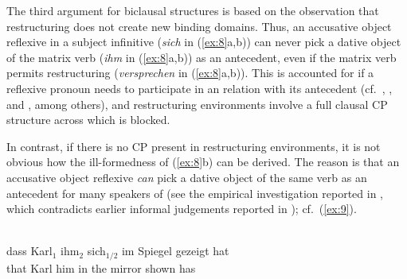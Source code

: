 \documentclass[output=paper]{langsci/langscibook}
\begin{document}
\largerpage[1]
The third argument for biclausal structures is based on the observation that
restructuring does not create new binding domains.  Thus, an accusative object
reflexive in a subject  infinitive ({\itshape sich} in (\ref{ex:8}a,b)) can
never pick a dative object of the matrix verb ({\itshape ihm} in (\ref{ex:8}a,b)) as
an antecedent, even if the matrix verb permits restructuring ({\itshape versprechen}
in (\ref{ex:8}a,b)). This is accounted for if a reflexive pronoun needs to
participate in an  relation with its antecedent (cf.\
\citealt{Reuland:01,Reuland:11}, \citealt{Fischer:04}, and \citealt{Hicks:09},
among others), and restructuring environments involve a full clausal CP
structure across which \isi{Agree} is blocked.

\ea\label{ex:8} 
    \z
\z

In contrast, if there is no CP present in restructuring environments, it is not
obvious how the ill-formedness of (\ref{ex:8}b) can be derived. The reason is
that an accusative\is{accusative case} object reflexive {\itshape can} pick a dative object of the same
verb as an antecedent for many speakers of \ili{German} (see the empirical
investigation reported in
\citealt{Sternefeld&Featherston:03,Featherston&Sternefeld:03}, which
contradicts earlier informal judgements reported in \citealt{Grewendorf:88});
cf.\ (\ref{ex:9}).

\ea\label{ex:9} \\
    \gll dass Karl$_1$  ihm$_2$   sich$_{1/2}$ im Spiegel gezeigt hat\\
        that Karl\textsubscript{\Nom}   him\textsubscript{\Dat}  \Refl{} {in the} mirror shown has\\
\z
\end{document}
